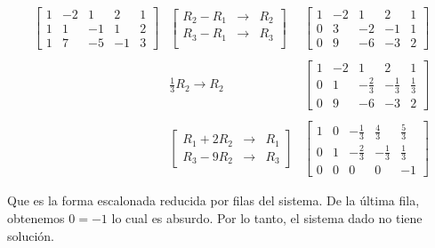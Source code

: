 \begin{enumerate}[1.]
	$$\begin{array}{ccc}

	    \left[\begin{array}{rrrr|r}
		1 & -2 & 1 & 2 & 1 \\
		1 & 1 & -1 & 1 & 2 \\
		1 & 7 & -5 & -1 & 3
	    \end{array}\right]
	    &\left[\begin{array}{rcl}
		R_2-R_1 &\to& R_2 \\
		R_3-R_1 &\to& R_3 \\
	    \end{array}\right]&
	    \left[\begin{array}{rrrr|r}
		1 & -2 & 1 & 2 & 1 \\
		0 & 3 & -2 & -1 & 1 \\
		0 & 9 & -6 & -3 & 2
	    \end{array}\right]\\\\
	    &\frac{1}{3}R_2\to R_2&
	    \left[\begin{array}{rrrr|r}
		1 & -2 & 1 & 2 & 1 \\
		0 & 1 & -\frac{2}{3} & -\frac{1}{3} & \frac{1}{3} \\
		0 & 9 & -6 & -3 & 2
	    \end{array}\right]\\\\
	    &\left[\begin{array}{rcl}
		R_1+2R_2 &\to& R_1 \\
		R_3-9R_2&\to&R_3
	    \end{array}\right]&
	    \left[\begin{array}{rrrr|r}
		1 & 0 & -\frac{1}{3} & \frac{4}{3} & \frac{5}{3} \\
		0 & 1 & -\frac{2}{3} & -\frac{1}{3} & \frac{1}{3} \\
		0 & 0 & 0 & 0 & -1 
	    \end{array}\right]

	\end{array}$$

	Que es la forma escalonada reducida por filas del sistema. De la última fila, obtenemos $0=-1$ lo cual es absurdo. Por lo tanto, el sistema dado no tiene solución.\\\\



\end{enumerate}
